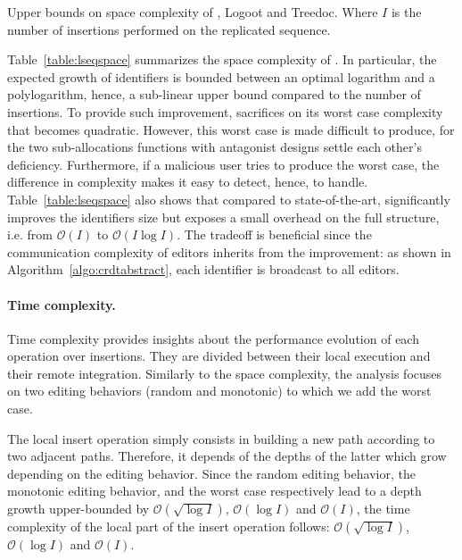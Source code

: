 \begin{table}
  \vspace{\ABOVETABLES}
  \caption{\label{table:lseqspace}
    Upper bounds on space complexity of \LSEQ, Logoot and Treedoc. Where
    $I$ is the number of insertions performed on the replicated sequence.}
  \centering
  
  \vspace{-\ABOVETABLES}
\end{table}

Table~\ref{table:lseqspace} summarizes the space complexity of \LSEQ. In
particular, the expected growth of identifiers is bounded between an optimal
logarithm and a polylogarithm, hence, a sub-linear upper bound compared to the
number of insertions. To provide such improvement, \LSEQ sacrifices on its worst
case complexity that becomes quadratic. However, this worst case is made
difficult to produce, for the two sub-allocations functions with antagonist
designs settle each other's deficiency. Furthermore, if a malicious user tries
to produce the worst case, the difference in complexity makes it easy to detect,
hence, to handle. Table~\ref{table:lseqspace} also shows that compared to
state-of-the-art, \LSEQ significantly improves the identifiers size but exposes
a small overhead on the full structure, i.e. from $\mathcal{O}(I)$ to
$\mathcal{O}(I\log I)$. The tradeoff is beneficial since the communication
complexity of editors inherits from the improvement: as shown in
Algorithm~\ref{algo:crdtabstract}, each identifier is broadcast to all editors.


\paragraph{Time complexity.}

Time complexity provides insights about the performance evolution of each
operation over insertions. They are divided between their local execution and
their remote integration.  Similarly to the space complexity, the analysis
focuses on two editing behaviors (random and monotonic) to which we add the
worst case.

The local insert operation simply consists in building a new path according to
two adjacent paths. Therefore, it depends of the depths of the latter which grow
depending on the editing behavior. Since the random editing behavior, the
monotonic editing behavior, and the worst case respectively lead to a depth
growth upper-bounded by $\mathcal{O}(\sqrt{\log I})$, $\mathcal{O}(\log I)$ and
$\mathcal{O}(I)$, the time complexity of the local part of the insert operation
follows: $\mathcal{O}(\sqrt{\log I})$, $\mathcal{O}(\log I)$ and
$\mathcal{O}(I)$.

